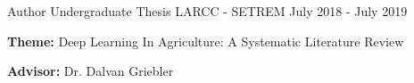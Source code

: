 
\begin{cventries}
  \cventry
  {Author} %
  {Undergraduate Thesis} %
  {LARCC - SETREM} %
  {July 2018 - July 2019} %
  {
    \begin{cvitems} %
      \item {\textbf{Theme:} Deep Learning In Agriculture: A Systematic Literature Review}
      \item {\textbf{Advisor:} Dr. Dalvan Griebler}
    \end{cvitems}
  }
\end{cventries}
